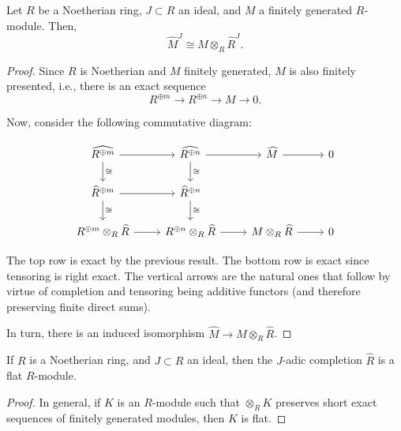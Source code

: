 \documentclass[12pt]{article}
\begin{document}
\begin{cor}
	Let $R$ be a Noetherian ring, $J \subset R$ an ideal, and $M$ a finitely generated $R$-module. Then,
	\begin{equation*} 
		\widehat{M}^{J} \cong M \otimes_{R} \widehat{R}^{J}.
	\end{equation*}
\end{cor}
\begin{proof} 
	Since $R$ is Noetherian and $M$ finitely generated, $M$ is also finitely presented, i.e., there is an exact sequence
	\begin{equation*} 
		R^{\oplus m} \to R^{\oplus n} \to M \to 0.
	\end{equation*}

	Now, consider the following commutative diagram:

	\begin{equation*} 
		\begin{tikzcd}
			\widehat{R^{\oplus m}} \arrow[r] \arrow[d, "\cong"] & \widehat{R^{\oplus n}} \arrow[r] \arrow[d, "\cong"] & \widehat{M} \arrow[r] & 0 \\
			\widehat{R}^{\oplus m} \arrow[r] \arrow[d, "\cong"] & \widehat{R}^{\oplus n} \arrow[d, "\cong"] & \\
			R^{\oplus m} \otimes_{R} \widehat{R} \arrow[r] & R^{\oplus n} \otimes_{R} \widehat{R} \arrow[r] & M \otimes_{R} \widehat{R} \arrow[r] & 0
		\end{tikzcd}
	\end{equation*}

	The top row is exact by the previous result. The bottom row is exact since tensoring is right exact. The vertical arrows are the natural ones that follow by virtue of completion and tensoring being additive functors (and therefore preserving finite direct sums). 

	In turn, there is an induced isomorphism $\widehat{M} \to M \otimes_{R} \widehat{R}$. 
\end{proof}

\begin{cor}
	If $R$ is a Noetherian ring, and $J \subset R$ an ideal, then the $J$-adic completion $\widehat{R}$ is a flat $R$-module.
\end{cor}
\begin{proof} 
	In general, if $K$ is an $R$-module such that $\otimes_{R} K$ preserves short exact sequences of finitely generated modules, then $K$ is flat. 
\end{proof}
\end{document}
